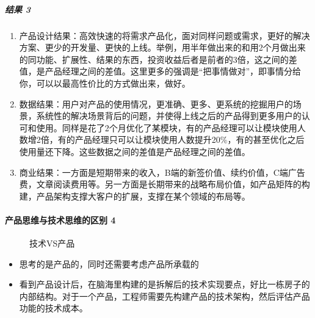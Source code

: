 \documentclass[letterpaper,10pt,english]{sphinxmanual}
\begin{document}
\subparagraph{结果 3\sphinxfootnotemark[199]}
\label{\detokenize{chapter_introduction/PM:id52}}%
\begin{footnotetext}[199]\sphinxAtStartFootnote
{}
%
\end{footnotetext}\ignorespaces \begin{enumerate}
%
\item {} 
产品设计结果：高效快速的将需求产品化，面对同样问题或需求，更好的解决方案、更少的开发量、更快的上线。举例，用半年做出来的和用2个月做出来的同功能、扩展性、结果的东西，投资收益后者是前者的3倍，这之间的差值，是产品经理之间的差值。这里更多的强调是“把事情做对”，即事情分给你，可以以最高性价比的方式做出来，做好。

\item {} 
数据结果：用户对产品的使用情况，更准确、更多、更系统的挖掘用户的场景，系统性的解决场景背后的问题，并使得上线之后的产品得到更多用户的认可和使用。同样是花了2个月优化了某模块，有的产品经理可以让模块使用人数增2倍，有的产品经理只可以让模块使用人数提升20\%，有的甚至优化之后使用量还下降。这些数据之间的差值是产品经理之间的差值。

\item {} 
商业结果：一方面是短期带来的收入，B端的新签价值、续约价值，C端广告费，文章阅读费用等。另一方面是长期带来的战略布局价值，如产品矩阵的构建，产品架构支撑大客户的扩展，支撑在某个领域的布局等。

\end{enumerate}


\paragraph{产品思维与技术思维的区别 4\sphinxfootnotemark[200]}
\label{\detokenize{chapter_introduction/PM:id53}}%
\begin{footnotetext}[200]\sphinxAtStartFootnote
{}
%
\end{footnotetext}\ignorespaces 
\begin{figure}[H]
\centering
\capstart

\noindent{}
\caption{技术VS产品}\label{\detokenize{chapter_introduction/PM:id72}}\end{figure}
\begin{itemize}
\item {} 
思考的是产品的，同时还需要考虑产品所承载的

\item {} 
看到产品设计后，在脑海里构建的是拆解后的技术实现要点，好比一栋房子的内部结构。对于一个产品，工程师需要先构建产品的技术架构，然后评估产品功能的技术成本。

\end{itemize}
\end{document}
